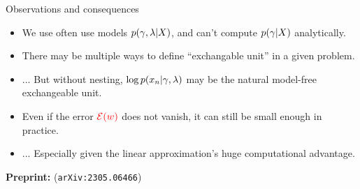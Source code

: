 \begin{frame}{Observations and consequences}


\begin{minipage}{0.38\textwidth}
    \ElectionData{}
\end{minipage}
\begin{minipage}{0.38\textwidth}
    \ElectionResultsGlobal{}
\end{minipage}



%
\begin{itemize}
\item We use often use models $p(\gamma, \lambda \vert X)$, and can't 
      compute $p(\gamma \vert X)$ analytically.
\item There may be multiple ways to define ``exchangable unit'' in a given
      problem.
\item[] ... But without nesting,
        $\log p(x_n \vert \gamma, \lambda)$
        may be the natural model-free exchangeable unit.
\item Even if the error $\textcolor{red}{\mathcal{E}(w)}$ does not vanish,
      it can still be small enough in practice.
      \item[] ... Especially given the linear approximation's huge computational advantage.
\end{itemize}
%
\textbf{Preprint: }\citet{giordano:2023:bayesij} (\texttt{arXiv:2305.06466})

    
\end{frame}



